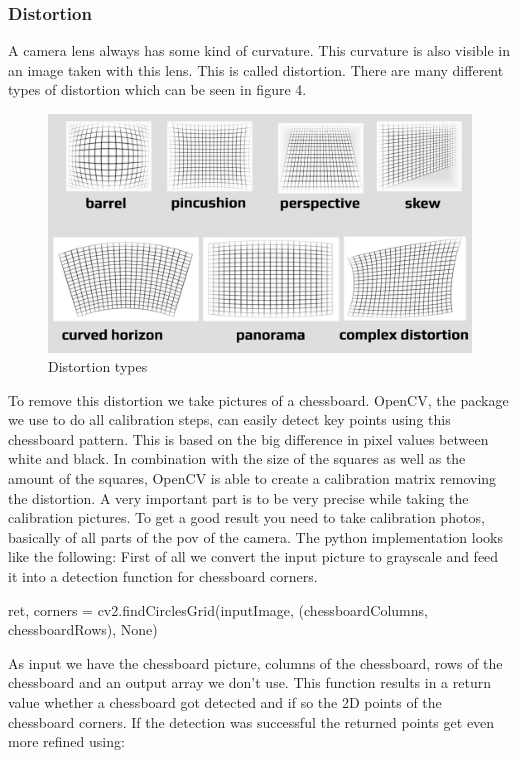 \documentclass[journal,onecolumn]{IEEEtran}
\begin{document}
\subsubsection{Distortion}
\noindent
A camera lens always has some kind of curvature. This curvature is also visible in an image taken with this lens. This is called distortion. There are many different types of distortion which can be seen in figure 4.
\begin{figure}[H]
	\centering
	\includegraphics[scale=0.3]{distortion.jpg}
	\captionsetup{justification=centering}
	\caption{Distortion types}
\end{figure}
\noindent
To remove this distortion we take pictures of a chessboard. OpenCV, the package we use to do all calibration steps, can easily detect key points using this chessboard pattern. This is based on the big difference in pixel values between white and black. In combination with the size of the squares as well as the amount of the squares, OpenCV is able to create a calibration matrix removing the distortion.\newline
A very important part is to be very precise while taking the calibration pictures. To get a good result you need to take calibration photos, basically of all parts of the pov of the camera.\newline
The python implementation looks like the following:
First of all we convert the input picture to grayscale and feed it into a detection function for chessboard corners.
\begin{python}
ret, corners = cv2.findCirclesGrid(inputImage,
				  (chessboardColumns, chessboardRows),
				  None)
\end{python}
As input we have the chessboard picture, columns of the chessboard, rows of the chessboard and an output array we don't use.
This function results in a return value whether a chessboard got detected and if so the 2D points of the chessboard corners. If the detection was successful the returned points get even more refined using:
\end{document}
